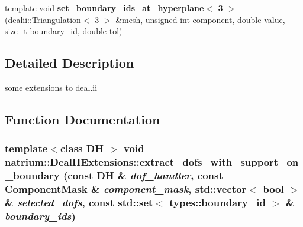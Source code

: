 \begin{DoxyCompactItemize}
\item 
\hypertarget{namespacenatrium_1_1DealIIExtensions_ad860cc7a713cef79e2ebb0e9bef6f23a}{
template void {\bfseries set\_\-boundary\_\-ids\_\-at\_\-hyperplane$<$ 3 $>$} (dealii::Triangulation$<$ 3 $>$ \&mesh, unsigned int component, double value, size\_\-t boundary\_\-id, double tol)}
\label{namespacenatrium_1_1DealIIExtensions_ad860cc7a713cef79e2ebb0e9bef6f23a}

\end{DoxyCompactItemize}


\subsection{Detailed Description}
some extensions to deal.ii 

\subsection{Function Documentation}
\hypertarget{namespacenatrium_1_1DealIIExtensions_ad74bfc63a45e2d4c1c9f2dd625cf1a66}{
\subsubsection[{extract\_\-dofs\_\-with\_\-support\_\-on\_\-boundary}]{\setlength{\rightskip}{0pt plus 5cm}template$<$class DH $>$ void natrium::DealIIExtensions::extract\_\-dofs\_\-with\_\-support\_\-on\_\-boundary (const DH \& {\em dof\_\-handler}, \/  const ComponentMask \& {\em component\_\-mask}, \/  std::vector$<$ bool $>$ \& {\em selected\_\-dofs}, \/  const std::set$<$ types::boundary\_\-id $>$ \& {\em boundary\_\-ids})}}
\label{namespacenatrium_1_1DealIIExtensions_ad74bfc63a45e2d4c1c9f2dd625cf1a66}



